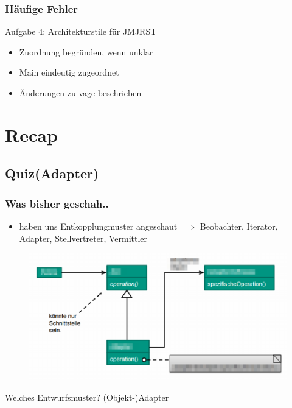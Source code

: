\documentclass[18pt]{beamer}
\begin{document}
	\begin{frame}
		\frametitle{Häufige Fehler}
		\begin{block}{Aufgabe 4: Architekturstile für JMJRST}
			\begin{itemize}
				\item Zuordnung begründen, wenn unklar \pause
				\item Main eindeutig zugeordnet \pause
				\item Änderungen zu vage beschrieben
			\end{itemize}
		\end{block}
	\end{frame}

\section{Recap}
	\subsection{Quiz(Adapter)}
	\begin{frame}
		\frametitle{Was bisher geschah..}
		\begin{itemize}
			\item haben uns Entkopplungmuster angeschaut \pause
			\linebreak $\implies$ Beobachter, Iterator, Adapter, Stellvertreter, Vermittler \pause
		\end{itemize}
		\begin{figure}
			\includegraphics[scale=0.33]{./pics/tut4/adap-obj-mod.png}
		\end{figure}
		Welches Entwurfsmuster? \pause (Objekt-)Adapter
	\end{frame}
	
\end{document}
